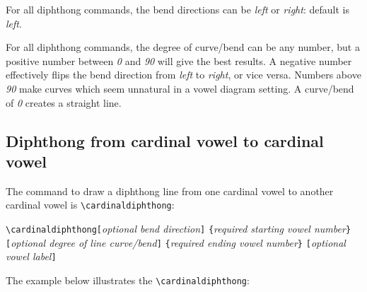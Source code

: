 \documentclass{article}
\def\\{}%
\begin{document}
For all diphthong commands, the bend directions can be \textit{left} or \textit{right}: default is \textit{left}.  

For all diphthong commands, the degree of curve/bend can be any number, but a positive number between \textit{0} and \textit{90} will give the best results.  A negative number effectively flips the bend direction from \textit{left} to \textit{right}, or vice versa.  Numbers above \textit{90} make curves which seem unnatural in a vowel diagram setting.  A curve/bend of \textit{0} creates a straight line.

\subsection{Diphthong from cardinal vowel to cardinal vowel}
\label{sec:Diphthong from cardinal vowel to cardinal vowel}

The command to draw a diphthong line from one cardinal vowel to another cardinal vowel is \verb|\cardinaldiphthong|:

\medskip
\qquad \verb+\cardinaldiphthong[+\textit{optional bend direction}\verb+]+\\
\qquad\hspace*{12em} \verb+{+\textit{required starting vowel number}\verb+}+\\
\qquad\hspace*{12em} \verb+[+\textit{optional degree of line curve/bend}\verb+]+\\
\qquad\hspace*{12em} \verb+{+\textit{required ending vowel number}\verb+}+\\
\qquad\hspace*{12em} \verb+[+\textit{optional vowel label}\verb+]+\\
\bigskip

\noindent
The example below illustrates the \verb|\cardinaldiphthong|:
\end{document}
